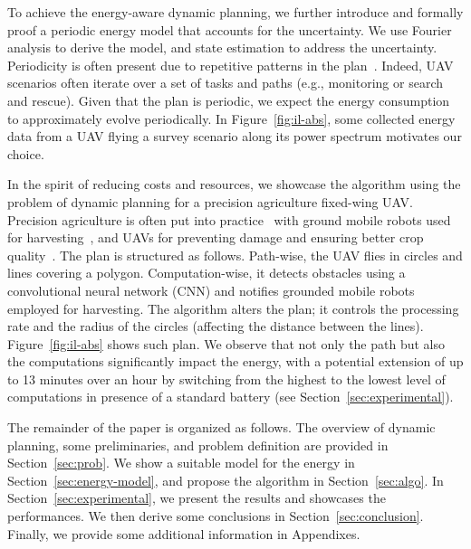 \documentclass[letterpaper,10pt,conference]{ieeeconf}
\theoremstyle{definition}
\begin{document}
To achieve the energy-aware dynamic planning, we further introduce and formally proof a periodic energy model that accounts for the uncertainty. We use Fourier analysis to derive the model, and state estimation to address the uncertainty. Periodicity is often present due to repetitive patterns in the plan~\cite{seewald2020mechanical}. Indeed, UAV scenarios often iterate over a set of tasks and paths (e.g., monitoring or search and rescue). Given that the plan is periodic, we expect the energy consumption to approximately evolve periodically. In Figure~\ref{fig:il-abs}, some collected energy data from a UAV flying a survey scenario along its power spectrum motivates our choice.

In the spirit of reducing costs and resources, we showcase the algorithm using the problem of dynamic planning for a precision agriculture fixed-wing UAV. Precision agriculture is often put into practice~\cite{hajjaj2014review} with ground mobile robots used for harvesting~\cite{qingchun2012study,dong2011development, de2011design, aljanobi2010setup, li2008analysis, edan2000robotic}, and UAVs for preventing damage and ensuring better crop quality~\cite{puri2017agriculture, daponte2019review}. The plan is structured as follows. Path-wise, the UAV flies in circles and lines covering a polygon. Computation-wise, it detects obstacles using a convolutional neural network (CNN) and notifies grounded mobile robots employed for harvesting. The algorithm alters the plan; it controls the processing rate and the radius of the circles (affecting the distance between the lines). Figure~\ref{fig:il-abs} shows such plan. We observe that not only the path but also the computations significantly impact the energy, with a potential extension of up to 13 minutes over an hour by switching from the highest to the lowest level of computations in presence of a standard battery (see Section~\ref{sec:experimental}).

The remainder of the paper is organized as follows. The overview of dynamic planning, some preliminaries, and problem definition are provided in Section~\ref{sec:prob}. We show a suitable model for the energy in Section~\ref{sec:energy-model}, and propose the algorithm in Section~\ref{sec:algo}. In Section~\ref{sec:experimental}, we present the results and showcases the performances. We then derive some conclusions in Section~\ref{sec:conclusion}. Finally, we provide some additional information in Appendixes.


\end{document}

